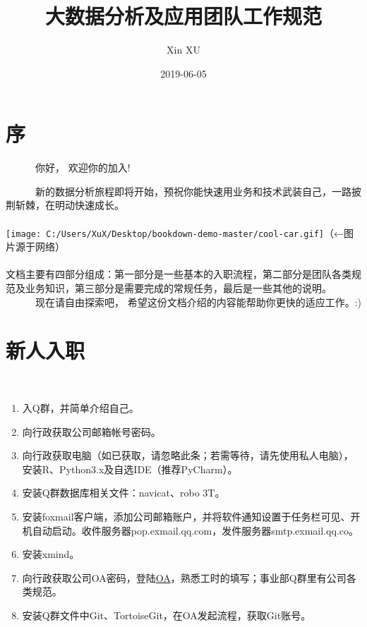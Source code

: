 \documentclass[]{book}
\title{大数据分析及应用团队工作规范}
\author{Xin XU}
\date{2019-06-05}
\begin{document}
\maketitle

{
\setcounter{tocdepth}{1}
\tableofcontents
}
\hypertarget{section}{%
\chapter{序}\label{section}}

~~~~~~你好， 欢迎你的加入!

~~~~~~新的数据分析旅程即将开始，预祝你能快速用业务和技术武装自己，一路披荆斩棘，在明动快速成长。\\
~\\
\hspace*{0.333em}\hspace*{0.333em}\hspace*{0.333em}\hspace*{0.333em}\hspace*{0.333em}\hspace*{0.333em}\texttt{[image: C:/Users/XuX/Desktop/bookdown-demo-master/cool-car.gif]}（←图片源于网络）\\
~\\
\hspace*{0.333em}\hspace*{0.333em}\hspace*{0.333em}\hspace*{0.333em}\hspace*{0.333em}\hspace*{0.333em}文档主要有四部分组成：第一部分是一些基本的入职流程，第二部分是团队各类规范及业务知识，第三部分是需要完成的常规任务，最后是一些其他的说明。\\
~~~~~~现在请自由探索吧， 希望这份文档介绍的内容能帮助你更快的适应工作。:)

\hypertarget{intro}{%
\chapter{新人入职}\label{intro}}

~~~~~~

\begin{enumerate}
\def\labelenumi{\arabic{enumi}.}
\item
  入Q群，并简单介绍自己。
\item
  向行政获取公司邮箱帐号密码。
\item
  向行政获取电脑（如已获取，请忽略此条；若需等待，请先使用私人电脑），安装R、Python3.x及自选IDE（推荐PyCharm）。
\item
  安装Q群数据库相关文件：navicat、robo 3T。
\item
  安装foxmail客户端，添加公司邮箱账户，并将软件通知设置于任务栏可见、开机自动启动。收件服务器pop.exmail.qq.com，发件服务器smtp.exmail.qq.co。
\item
  安装xmind。
\item
  向行政获取公司OA密码，登陆\href{http://192.168.0.212/instance-web/minstone/login}{OA}，熟悉工时的填写；事业部Q群里有公司各类规范。
\item
  安装Q群文件中Git、TortoiseGit，在OA发起流程，获取Git账号。
\end{enumerate}
\end{document}

